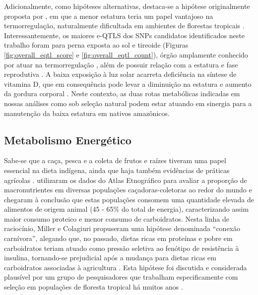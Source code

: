 Adicionalmente, como hipóteses alternativas, destaca-se a hipótese originalmente proposta por , em que a menor estatura teria um papel vantajoso na termorregulação, naturalmente dificultada em ambientes de florestas tropicais \cite{perry_evolution_2009}. Interessantemente, os maiores e-QTLS dos SNPs candidatos identificados neste trabalho foram para perna exposta ao sol e tireoide (Figuras \ref{fig:overall_eqtl_score} e \ref{fig:overall_eqtl_count}), órgão amplamente conhecido por atuar na termorregulação \cite{iwen_effects_2018}, além de possuir relação com a estatura e fase reprodutiva \cite{tarim_thyroid_2011,silva_thyroid_2018}. A baixa exposição à luz solar acarreta deficiência na síntese de vitamina D, que em consequência pode levar a diminuição na estatura e aumento da gordura corporal \cite{kremer_vitamin_2009,missaggia_adaptation_2020}. Neste contexto, as duas rotas metabólicas indicadas em nossas análises como sob seleção natural podem estar atuando em sinergia para a manutenção da baixa estatura em nativos amazônicos.

\subsection{Metabolismo Energético}

Sabe-se que a caça, pesca e a coleta de frutos e raízes tiveram uma papel essencial na dieta indígena, ainda que haja também evidências de práticas agrícolas \cite{soares_perfil_2015}.  utilizaram os dados do Atlas Etnográfico \cite{murdock_ethnographic_1967} para avaliar a proporção de macronutrientes em diversas populações caçadoras-coletoras ao redor do mundo e chegaram à conclusão que estas populações consomem uma quantidade elevada de alimentos de origem animal (45 - 65\% do total de energia), caracterizando assim maior consumo proteico e menor consumo de carboidratos. Nesta linha de raciocínio, Miller e Colagiuri propuseram uma hipótese denominada “conexão carnívora”, alegando que, no passado, dietas ricas em proteínas e pobre em carboidratos teriam atuado como pressão seletiva ao fenótipo de resistência à insulina, tornando-se prejudicial após a mudança para dietas ricas em carboidratos associadas à agricultura \cite{miller_carnivore_1994,colagiuri_carnivore_2002}. Esta hipótese foi discutida e considerada plausível por um grupo de pesquisadores que trabalham especificamente com seleção em populações de floresta tropical há muitos anos \cite{luca_evolutionary_2010}.

